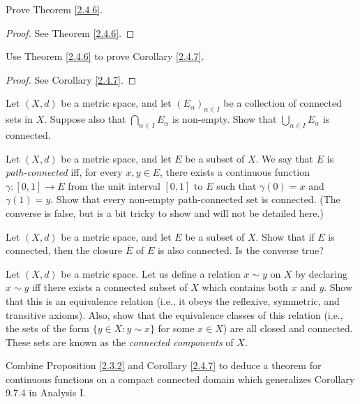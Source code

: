 \begin{exercise}\label{ex 2.4.4}
    Prove Theorem \ref{2.4.6}.
\end{exercise}

\begin{proof}
    See Theorem \ref{2.4.6}.
\end{proof}

\begin{exercise}\label{ex 2.4.5}
    Use Theorem \ref{2.4.6} to prove Corollary \ref{2.4.7}.
\end{exercise}

\begin{proof}
    See Corollary \ref{2.4.7}.
\end{proof}

\begin{exercise}\label{ex 2.4.6}
    Let \((X, d)\) be a metric space, and let \((E_\alpha)_{\alpha \in I}\) be a collection of connected sets in \(X\).
    Suppose also that \(\bigcap_{\alpha \in I} E_\alpha\) is non-empty.
    Show that \(\bigcup_{\alpha \in I} E_\alpha\) is connected.
\end{exercise}

\begin{exercise}\label{ex 2.4.7}
    Let \((X, d)\) be a metric space, and let \(E\) be a subset of \(X\).
    We say that \(E\) is \emph{path-connected} iff, for every \(x, y \in E\), there exists a continuous function \(\gamma : [0, 1] \to E\) from the unit interval \([0, 1]\) to \(E\) such that \(\gamma(0) = x\) and \(\gamma(1) = y\).
    Show that every non-empty path-connected set is connected.
    (The converse is false, but is a bit tricky to show and will not be detailed here.)
\end{exercise}

\begin{exercise}\label{ex 2.4.8}
    Let \((X, d)\) be a metric space, and let \(E\) be a subset of \(X\).
    Show that if \(E\) is connected, then the closure \(\overline{E}\) of \(E\) is also connected.
    Is the converse true?
\end{exercise}

\begin{exercise}\label{ex 2.4.9}
    Let \((X, d)\) be a metric space. Let us define a relation \(x \sim y\) on \(X\) by declaring \(x \sim y\) iff there exists a connected subset of \(X\) which contains both \(x\) and \(y\).
    Show that this is an equivalence relation (i.e., it obeys the reflexive, symmetric, and transitive axioms).
    Also, show that the equivalence classes of this relation (i.e., the sets of the form \(\{y \in  X : y \sim x\}\) for some \(x \in X\)) are all closed and connected.
    These sets are known as the \emph{connected components} of \(X\).
\end{exercise}

\begin{exercise}\label{ex 2.4.10}
    Combine Proposition \ref{2.3.2} and Corollary \ref{2.4.7} to deduce a theorem for continuous functions on a compact connected domain which generalizes Corollary 9.7.4 in Analysis I.
\end{exercise}
